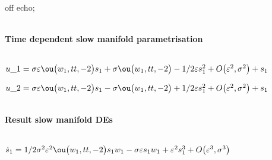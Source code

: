 \documentclass[11pt,a5paper]{article}
\begin{document}



off echo;

\(\)
\paragraph{Time dependent slow manifold parametrisation}
\(
\)\par
\(u\_1=\sigma  \eps \ou\big(w_{1},tt,-2\big) s_{1}+\sigma  \ou\big(w_{1},
tt,-2\big)-1/2 \eps s_{1}^{2}+O\big(\varepsilon ^{2},\sigma^{2}\big)+s_{
1}
\)\par
\(u\_2=\sigma  \eps \ou\big(w_{1},tt,-2\big) s_{1}-\sigma  \ou\big(w_{1},
tt,-2\big)+1/2 \eps s_{1}^{2}+O\big(\varepsilon ^{2},\sigma^{2}\big)+s_{
1}
\)\par
\(\)
\paragraph{Result slow manifold DEs}
\(
\)\par
\(\dot s_{1}=1/2 \sigma ^{2} \eps^{2} \ou\big(w_{1},tt,-2\big) s_{1} w_{1}
-\sigma  \eps s_{1} w_{1}+\eps^{2} s_{1}^{3}+O\big(\varepsilon ^{3},
\sigma^{3}\big)
\)\par
\end{document}
